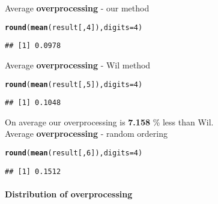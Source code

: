 \documentclass{article}\usepackage[]{graphicx}\usepackage[]{color}
\makeatletter
\newcommand{\hlnum}[1]{\textcolor[rgb]{0.686,0.059,0.569}{#1}}%
\newcommand{\hlstd}[1]{\textcolor[rgb]{0.345,0.345,0.345}{#1}}%
\newcommand{\hlkwc}[1]{\textcolor[rgb]{0.333,0.667,0.333}{#1}}%
\newcommand{\hlkwd}[1]{\textcolor[rgb]{0.737,0.353,0.396}{\textbf{#1}}}%
\newenvironment{kframe}{%
 \def\at@end@of@kframe{}%
 \ifinner\ifhmode%
  \def\at@end@of@kframe{\end{minipage}}%
  \begin{minipage}{\columnwidth}%
 \fi\fi%
 \def\FrameCommand##1{\hskip\@totalleftmargin \hskip-\fboxsep
 \colorbox{shadecolor}{##1}\hskip-\fboxsep
     \hskip-\linewidth \hskip-\@totalleftmargin \hskip\columnwidth}%
 \MakeFramed {\advance\hsize-\width
   \@totalleftmargin\z@ \linewidth\hsize
   \@setminipage}}%
 {\par\unskip\endMakeFramed%
 \at@end@of@kframe}
\newenvironment{knitrout}{}{} %
\makeatother
\begin{document}
Average \textbf{overprocessing} - our method

\begin{knitrout}
\color{fgcolor}\begin{kframe}
\begin{alltt}
\hlkwd{round}\hlstd{(}\hlkwd{mean}\hlstd{(result[,}\hlnum{4}\hlstd{]),}\hlkwc{digits} \hlstd{=} \hlnum{4}\hlstd{)}
\end{alltt}
\begin{verbatim}
## [1] 0.0978
\end{verbatim}
\end{kframe}
\end{knitrout}

Average \textbf{overprocessing} - Wil method

\begin{knitrout}
\color{fgcolor}\begin{kframe}
\begin{alltt}
\hlkwd{round}\hlstd{(}\hlkwd{mean}\hlstd{(result[,}\hlnum{5}\hlstd{]),}\hlkwc{digits} \hlstd{=} \hlnum{4}\hlstd{)}
\end{alltt}
\begin{verbatim}
## [1] 0.1048
\end{verbatim}
\end{kframe}
\end{knitrout}


 
On average our overprocessing is \textbf{7.158} \% less than Wil. \\

Average \textbf{overprocessing} - random ordering

\begin{knitrout}
\color{fgcolor}\begin{kframe}
\begin{alltt}
\hlkwd{round}\hlstd{(}\hlkwd{mean}\hlstd{(result[,}\hlnum{6}\hlstd{]),}\hlkwc{digits} \hlstd{=} \hlnum{4}\hlstd{)}
\end{alltt}
\begin{verbatim}
## [1] 0.1512
\end{verbatim}
\end{kframe}
\end{knitrout}

\paragraph{Distribution of overprocessing}
\end{document}
